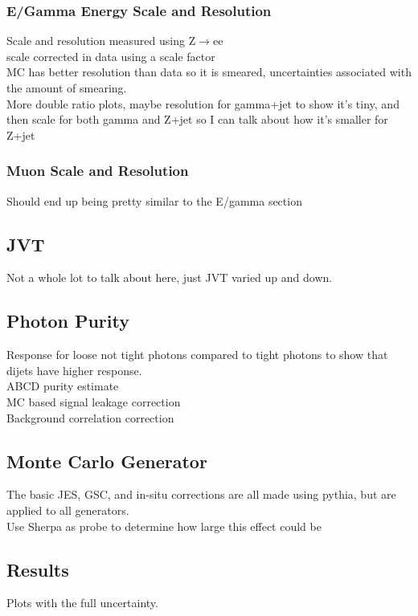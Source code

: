 \subsubsection{E/Gamma Energy Scale and Resolution}

Scale and resolution measured using Z$\rightarrow$ee~\cite{ATL-PHYS-PUB-2016-015}\\
scale corrected in data using a scale factor \\
MC has better resolution than data so it is smeared, uncertainties associated with the amount of smearing. \\
More double ratio plots, maybe resolution for gamma+jet to show it's tiny, and then scale for both gamma and Z+jet so I can talk about how it's smaller for Z+jet

\subsubsection{Muon Scale and Resolution}
Should end up being pretty similar to the E/gamma section

\subsection{JVT}
Not a whole lot to talk about here, just JVT varied up and down.  

\subsection{Photon Purity}

Response for loose not tight photons compared to tight photons to show that dijets have higher response.  \\
ABCD purity estimate \\
MC based signal leakage correction \\
Background correlation correction \\

\subsection{Monte Carlo Generator}

The basic JES, GSC, and in-situ corrections are all made using pythia, but are applied to all generators. \\
Use Sherpa as probe to determine how large this effect could be


\subsection{Results}

Plots with the full uncertainty.  



